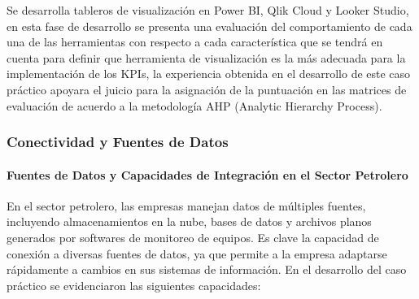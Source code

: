 \documentclass[
  11pt,
  bookmarksnumbered]{article}
\begin{document}
Se desarrolla tableros de visualización en Power BI, Qlik Cloud y Looker Studio, en esta fase de desarrollo se presenta una evaluación del comportamiento de cada una de las herramientas con respecto a cada característica que se tendrá en cuenta para definir que herramienta de visualización es la más adecuada para la implementación de los KPIs, la experiencia obtenida en el desarrollo de este caso práctico apoyara el juicio para la asignación de la puntuación en las matrices de evaluación de acuerdo a la metodología AHP (Analytic Hierarchy Process).

\hypertarget{conectividad-y-fuentes-de-datos}{%
\subsubsection{Conectividad y Fuentes de Datos}\label{conectividad-y-fuentes-de-datos}}

\hypertarget{fuentes-de-datos-y-capacidades-de-integraciuxf3n-en-el-sector-petrolero}{%
\paragraph{Fuentes de Datos y Capacidades de Integración en el Sector Petrolero}\label{fuentes-de-datos-y-capacidades-de-integraciuxf3n-en-el-sector-petrolero}}

En el sector petrolero, las empresas manejan datos de múltiples fuentes, incluyendo almacenamientos en la nube, bases de datos y archivos planos generados por softwares de monitoreo de equipos.
Es clave la capacidad de conexión a diversas fuentes de datos, ya que permite a la empresa adaptarse rápidamente a cambios en sus sistemas de información.
En el desarrollo del caso práctico se evidenciaron las siguientes capacidades:
\end{document}
